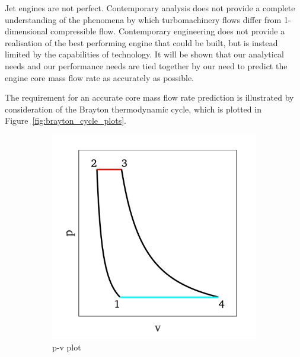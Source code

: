 \documentclass[a4paper, 11pt, oneside]{report}
\begin{document}
Jet engines are not perfect. Contemporary analysis does not provide a complete understanding of the phenomena by which turbomachinery flows differ from 1-dimensional compressible flow. Contemporary engineering does not provide a realisation of the best performing engine that could be built, but is instead limited by the capabilities of technology. It will be shown that our analytical needs and our performance needs are tied together by our need to predict the engine core mass flow rate as accurately as possible.

The requirement for an accurate core mass flow rate prediction is illustrated by consideration of the Brayton thermodynamic cycle, which is plotted in Figure~\ref{fig:brayton_cycle_plots}.

\begin{figure}[H]
	\centering
	\begin{subfigure}{.45\textwidth}
		\centering
		\includegraphics[width=\linewidth]{figs/brayton_cycle_pv_plot.png}
		\caption{p-v plot}
		\label{fig:brayton_cycle_pv_plot}
	\end{subfigure}
	\hspace{0.05\textwidth}
	\begin{subfigure}{.45\textwidth}
		\centering

\end{subfigure}
\end{figure}
\end{document}
